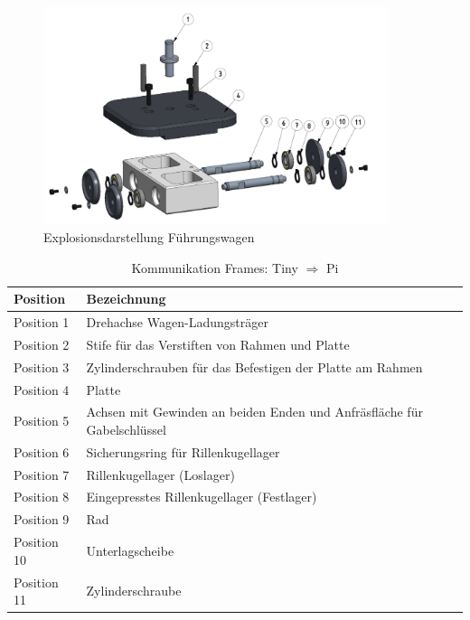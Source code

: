 \documentclass[../../main.tex]{subfiles}
\begin{document}
    \begin{figure}[H] %
        \centering
        \includegraphics[width=0.9\textwidth]{Fuehrungswagen.png}
        \caption{Explosionsdarstellung Führungswagen}
        \label{fig:antriebseinheit}
    \end{figure} 

    \begin{table}[H] \centering
        \begin{tabular}{|l|l|}
        \hline
        \textbf{Position} & \textbf{Bezeichnung}\\
        \hline
        Position 1          & Drehachse Wagen-Ladungsträger\\
         \hline
        Position 2          & Stife für das Verstiften von Rahmen und Platte\\
        \hline
        Position 3          & Zylinderschrauben für das Befestigen der Platte am Rahmen\\
        \hline
        Position 4          & Platte\\
        \hline
        Position 5          & Achsen mit Gewinden an beiden Enden und Anfräsfläche für Gabelschlüssel\\
        \hline
        Position 6          & Sicherungsring für Rillenkugellager\\
        \hline
        Position 7          & Rillenkugellager (Loslager)\\
        \hline
        Position 8          & Eingepresstes Rillenkugellager (Festlager)\\
        \hline
        Position 9          & Rad\\
        \hline
        Position 10         & Unterlagscheibe\\
        \hline
        Position 11         & Zylinderschraube\\
        \hline
        \end{tabular}
        
        \caption{Kommunikation Frames: Tiny $\Rightarrow$ Pi}
        \label{tab:com_tiny_pi}
        \end{table}
    \newpage
\end{document}
